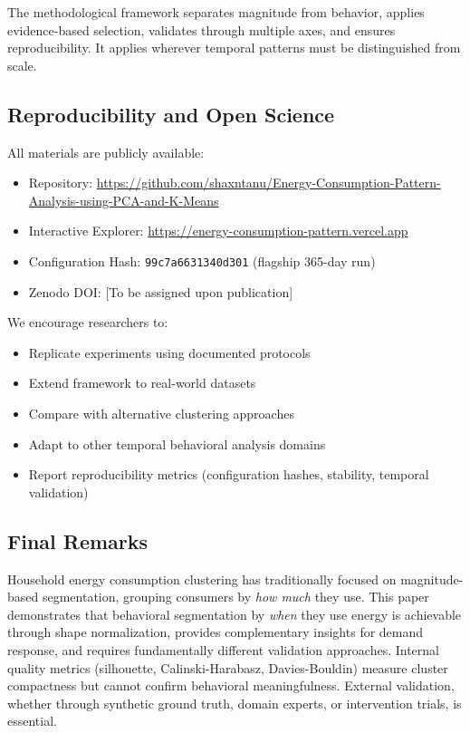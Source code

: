The methodological framework separates magnitude from behavior, applies evidence-based selection, validates through multiple axes, and ensures reproducibility. It applies wherever temporal patterns must be distinguished from scale.

\subsection{Reproducibility and Open Science}

All materials are publicly available:
\begin{itemize}
    \item Repository: \url{https://github.com/shaxntanu/Energy-Consumption-Pattern-Analysis-using-PCA-and-K-Means}
    \item Interactive Explorer: \url{https://energy-consumption-pattern.vercel.app}
    \item Configuration Hash: \texttt{99c7a6631340d301} (flagship 365-day run)
    \item Zenodo DOI: [To be assigned upon publication]
\end{itemize}

We encourage researchers to:
\begin{itemize}
    \item Replicate experiments using documented protocols
    \item Extend framework to real-world datasets
    \item Compare with alternative clustering approaches
    \item Adapt to other temporal behavioral analysis domains
    \item Report reproducibility metrics (configuration hashes, stability, temporal validation)
\end{itemize}

\subsection{Final Remarks}

Household energy consumption clustering has traditionally focused on magnitude-based segmentation, grouping consumers by \emph{how much} they use. This paper demonstrates that behavioral segmentation by \emph{when} they use energy is achievable through shape normalization, provides complementary insights for demand response, and requires fundamentally different validation approaches. Internal quality metrics (silhouette, Calinski-Harabasz, Davies-Bouldin) measure cluster compactness but cannot confirm behavioral meaningfulness. External validation, whether through synthetic ground truth, domain experts, or intervention trials, is essential.

